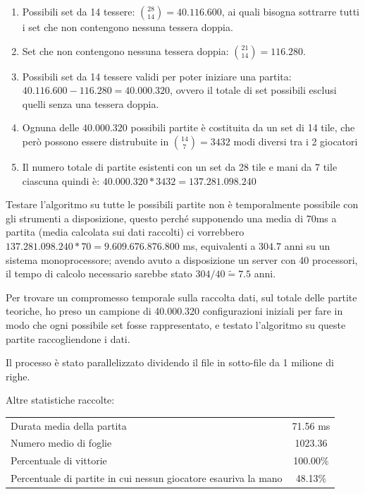 \documentclass[a4paper,12pt]{report} %
\begin{document}
\begin{enumerate}
    \item Possibili set da 14 tessere: \(\binom{28}{14} = 40.116.600\), ai quali bisogna sottrarre tutti i set che non contengono nessuna tessera doppia.
    \item Set che non contengono nessuna tessera doppia: \(\binom{21}{14} = 116.280\).
    \item Possibili set da 14 tessere validi per poter iniziare una partita: \(40.116.600 - 116.280 = 40.000.320\), ovvero il totale di set possibili esclusi quelli senza una tessera doppia.
    \item Ognuna delle \(40.000.320\) possibili partite è costituita da un set di 14 tile, che però possono essere distrubuite in \(\binom{14}{7} = 3432\) modi diversi tra i 2 giocatori
    \item Il numero totale di partite esistenti con un set da 28 tile e mani da 7 tile ciascuna quindi è: \(40.000.320 * 3432 = 137.281.098.240\)
\end{enumerate}

Testare l'algoritmo su tutte le possibili partite non è temporalmente possibile con gli strumenti a disposizione, questo perché supponendo una media di 70ms a partita (media calcolata sui dati raccolti) ci vorrebbero \(137.281.098.240 * 70  = 9.609.676.876.800\) ms, equivalenti a \(304.7\) anni su un sistema monoprocessore; avendo avuto a disposizione un server con 40 processori, il tempo di calcolo necessario sarebbe stato \(304 / 40 \tilde= 7.5\) anni. 

Per trovare un compromesso temporale sulla raccolta dati, sul totale delle partite teoriche, ho preso un campione di 40.000.320 configurazioni iniziali per fare in modo che ogni possibile set fosse rappresentato, e testato l'algoritmo su queste partite raccogliendone i dati.

Il processo è stato parallelizzato dividendo il file in sotto-file da 1 milione di righe.

\vspace{0.5cm}

Altre statistiche raccolte:

\begin{table}[h!]
    \centering
    \begin{tabular}{|l|c|}
        \hline
        Durata media della partita & 71.56 ms \\
        Numero medio di foglie & 1023.36 \\
        Percentuale di vittorie & 100.00\% \\
        Percentuale di partite in cui nessun giocatore esauriva la mano & 48.13\% \\
        \hline
    \end{tabular}
    \label{tab:global_stats}
\end{table}
\end{document}
